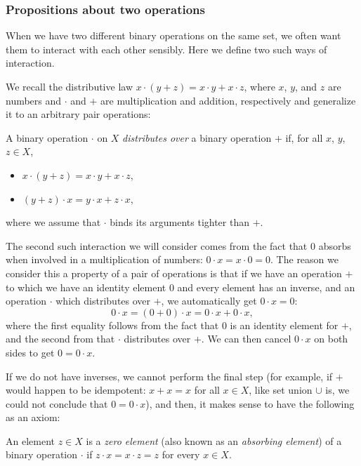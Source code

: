 \subsubsection{Propositions about two operations}
\label{two-operations}
When we have two different binary operations on the same set, we often want them to interact with each other sensibly. Here we define two such ways of interaction.

We recall the distributive law $x\cdot(y + z) = x\cdot y + x\cdot z$, where $x$, $y$, and $z$ are numbers and $\cdot$ and $+$ are multiplication and addition, respectively and generalize it to an arbitrary pair operations:
\begin{Definition}
  A binary operation $\cdot$ on $X$ \emph{distributes over} a binary operation $+$ if, for all $x$, $y$, $z \in X$,
  \begin{itemize}
  \item $x \cdot (y + z) = x \cdot y + x \cdot z$,
  \item $(y + z) \cdot x = y \cdot x + z \cdot x$,
  \end{itemize}
  where we assume that $\cdot$ binds its arguments tighter than $+$.
\end{Definition}

\label{zero-element}
The second such interaction we will consider comes from the fact that $0$ absorbs when involved in a multiplication of numbers: $0 \cdot x = x \cdot 0 = 0$. The reason we consider this a property of a pair of operations is that if we have an operation $+$ to which we have an identity element $0$ and every element has an inverse, and an operation $\cdot$ which distributes over $+$, we automatically get $0 \cdot x = 0$:
\begin{equation*}
  0 \cdot x = (0 + 0) \cdot x = 0 \cdot x + 0 \cdot x,
\end{equation*}
where the first equality follows from the fact that $0$ is an identity element for $+$, and the second from that $\cdot$ distributes over $+$. We can then cancel $0 \cdot x$ on both sides to get $0 = 0 \cdot x$.

If we do not have inverses, we cannot perform the final step (for example, if $+$ would happen to be idempotent: $x + x = x$ for all $x \in X$, like set union $\cup$ is, we could not conclude that $0 = 0 \cdot x$), and then, it makes sense to have the following as an axiom:
\begin{Definition}
  An element $z \in X$ is a \emph{zero element} (also known as an \emph{absorbing element}) of a binary operation $\cdot$ if $z \cdot x = x \cdot z = z$ for every $x \in X$.
\end{Definition}

